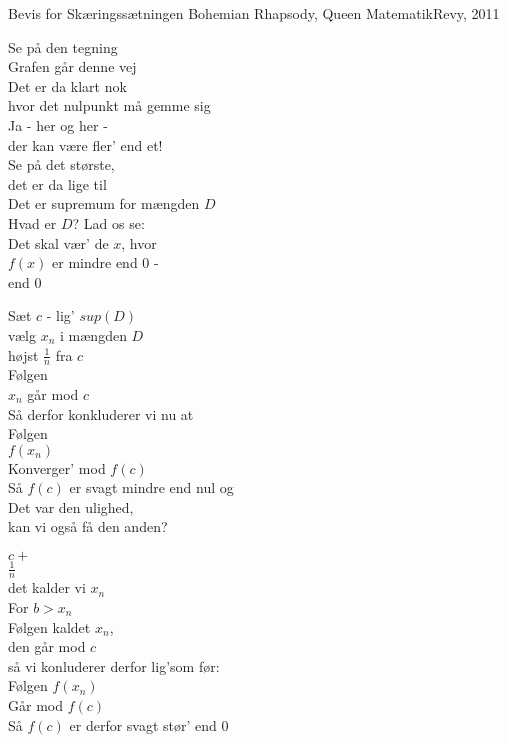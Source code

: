 \begin{song}{Bevis for Skæringssætningen}
  {} %
  {Bohemian Rhapsody, Queen} %
  {} %
  {MatematikRevy, 2011} %
  {\NotCCLIed} %

  \begin{SBSection*}
    Se på den tegning\\
    Grafen går denne vej\\
    Det er da klart nok\\
    hvor det nulpunkt må gemme sig\\
    Ja - her og her -\\
    der kan være fler' end et!\\
    Se på det største,\\
    det er da lige til\\
    Det er supremum for mængden $D$\\
    Hvad er $D$? Lad os se:\\
    Det skal vær' de $x$, hvor\\
    $f(x)$ er mindre end $0$ - \\
    end $0$
  \end{SBSection*}

  \begin{SBSection*}
    Sæt $c$ -
    lig' $sup(D)$\\
    vælg $x_n$ i mængden $D$\\
    højst $\frac{1}{n}$ fra $c$\\
    \medskip
    Følgen\\
    $x_n$ går mod $c$\\
    Så derfor konkluderer vi nu at\\
    \medskip
    Følgen\\
    $f(x_n)$\\
    Konverger' mod $f(c)$\\
    Så $f(c)$ er svagt mindre end nul og\\
    \medskip
    Det var den ulighed,\\
    kan vi også få den anden?
  \end{SBSection*}

  \begin{SBSection*}
    $c + $\\
    $\frac{1}{n}$\\
    det kalder vi $x_n$\\
    For $b > x_n$\\
    \medskip
    Følgen kaldet $x_n$,\\
    den går mod $c$\\
    så vi konluderer derfor lig'som før:\\
    \medskip
    Følgen $f(x_n)$\\
    Går mod $f(c)$\\
    Så $f(c)$ er derfor svagt stør' end $0$
  \end{SBSection*}


\end{song}

